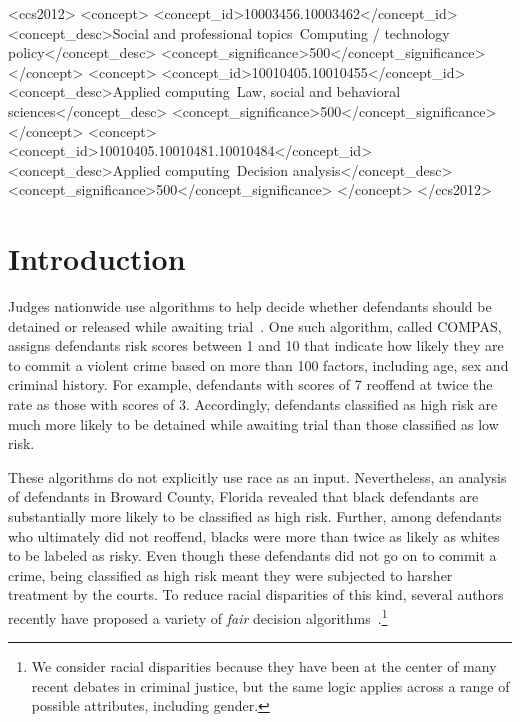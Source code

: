 \documentclass[sigconf]{acmart}
\begin{document}
%
%
\begin{CCSXML}
<ccs2012>
<concept>
<concept_id>10003456.10003462</concept_id>
<concept_desc>Social and professional topics~Computing / technology policy</concept_desc>
<concept_significance>500</concept_significance>
</concept>
<concept>
<concept_id>10010405.10010455</concept_id>
<concept_desc>Applied computing~Law, social and behavioral sciences</concept_desc>
<concept_significance>500</concept_significance>
</concept>
<concept>
<concept_id>10010405.10010481.10010484</concept_id>
<concept_desc>Applied computing~Decision analysis</concept_desc>
<concept_significance>500</concept_significance>
</concept>
</ccs2012>
\end{CCSXML}

%

\maketitle
\renewcommand{\shortauthors}{Corbett-Davies et al.}

\section{Introduction}

Judges nationwide use algorithms to help 
decide whether defendants should be detained or released while awaiting trial~\cite{monahan2016,christin2015}.
One such algorithm, called COMPAS, assigns defendants risk scores between 1 and 10 that indicate how likely they are to commit a violent crime based on more than 100 factors, including age, sex and criminal history. 
For example, defendants with scores of 7 reoffend at twice the rate as those with scores of 3. 
Accordingly, defendants classified as high risk are much more likely to be detained while awaiting trial than those classified as low risk.

These algorithms do not explicitly use race as an input. Nevertheless, an analysis of defendants in Broward County, Florida \cite{angwin2016} revealed that black defendants are substantially more likely to be classified as high risk. Further, among defendants who ultimately did not reoffend, blacks were more than twice as likely as whites to be labeled as risky. Even though these defendants did not go on to commit a crime, being classified as high risk meant they were subjected to harsher treatment by the courts.
To reduce racial disparities of this kind, several authors recently have  proposed a variety of \emph{fair} decision algorithms~\cite{feldman2015,kamiran2013,hardt2016,joseph2016fairness,jabbari2016fair,hajian2011discrimination}.\footnote{We consider racial disparities because they have been at the center of many recent debates in criminal justice, but the same logic applies across a range of possible attributes, including gender.}
\end{document}
